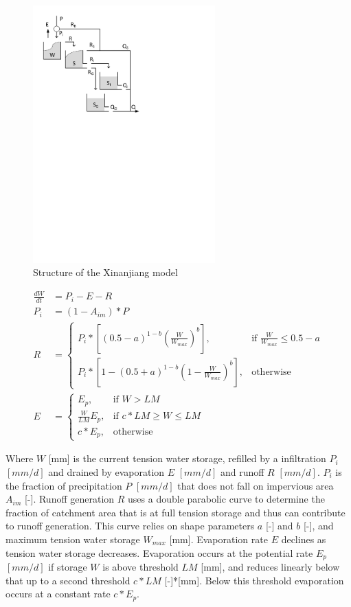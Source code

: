 { 																	%
\begin{figure}
\includegraphics[trim=1cm 17cm 7cm 1cm,width=7cm,keepaspectratio]{./files/28_schematic.pdf}
\caption{Structure of the Xinanjiang model} \label{fig:28_schematic}
\end{figure}

\begin{align}
	\frac{dW}{dt} &= P_i-E-R \\
	P_i &= (1-A_{im})*P \\
	R &= 
	\begin{cases}
		P_i * \left[(0.5-a)^{1-b}\left(\frac{W}{W_{max}}\right)^b\right] , & \text{if } \frac{W}{W_{max}} \leq 0.5-a \\
		P_i * \left[1-(0.5+a)^{1-b}\left(1-\frac{W}{W_{max}}\right)^b\right] , & \text{otherwise}
	\end{cases} \\
	E &= \begin{cases}
		E_p , & \text{if } W > LM \\
		\frac{W}{LM}E_p , & \text{if } c*LM \geq W \leq LM \\
		c*E_p , & \text{otherwise}
	\end{cases}
\end{align}

} %
\vspace{2cm}
Where $W$ [mm] is the current tension water storage, refilled by a infiltration $P_i$ $[mm/d]$ and drained by evaporation $E$ $[mm/d]$ and runoff $R$ $[mm/d]$.
$P_i$ is the fraction of precipitation $P$ $[mm/d]$ that does not fall on impervious area $A_{im}$ [-].
Runoff generation $R$ uses a double parabolic curve to determine the fraction of catchment area that is at full tension storage and thus can contribute to runoff generation. 
This curve relies on shape parameters $a$ [-] and $b$ [-], and maximum tension water storage $W_{max}$ [mm].
Evaporation rate $E$ declines as tension water storage decreases.
Evaporation occurs at the potential rate $E_p$ $[mm/d]$ if storage $W$ is above threshold $LM$ [mm], and reduces linearly below that up to a second threshold $c*LM$ [-]*[mm].
Below this threshold evaporation occurs at a constant rate $c*E_p$.

